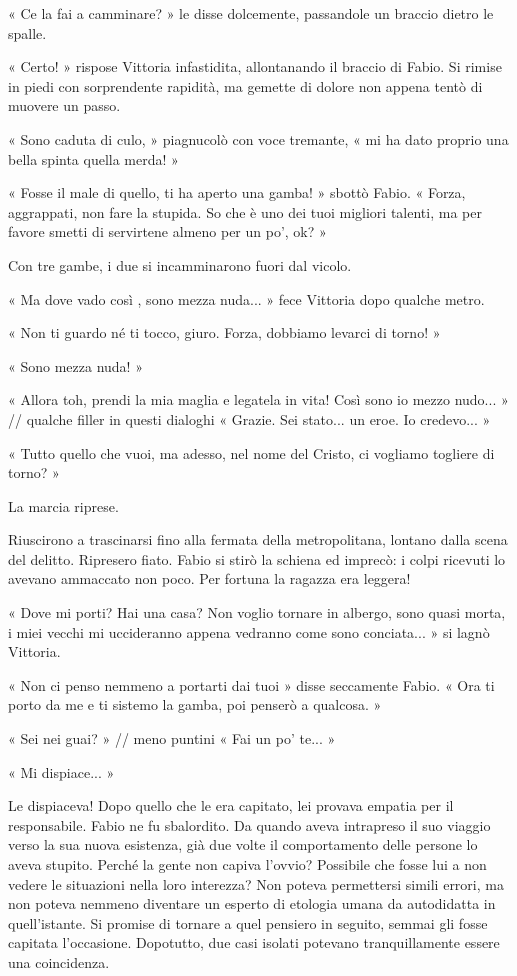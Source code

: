 « Ce la fai a camminare? » le disse dolcemente, passandole un braccio dietro le spalle.

« Certo! » rispose Vittoria infastidita, allontanando il braccio di Fabio. Si rimise in piedi con sorprendente rapidità, ma gemette di dolore non appena tentò di muovere un passo.

« Sono caduta di culo, » piagnucolò con voce tremante, « mi ha dato proprio una bella spinta quella merda! »

« Fosse il male di quello, ti ha aperto una gamba! » sbottò Fabio. « Forza, aggrappati, non fare la stupida. So che è uno dei tuoi migliori talenti, ma per favore smetti di servirtene almeno per un po', ok?  »

Con tre gambe, i due si incamminarono fuori dal vicolo.

« Ma dove vado così , sono mezza nuda... » fece Vittoria dopo qualche metro.

« Non ti guardo né ti tocco, giuro. Forza, dobbiamo levarci di torno! »

« Sono mezza nuda! »

« Allora toh, prendi la mia maglia e legatela in vita! Così sono io mezzo nudo... »
// qualche filler in questi dialoghi
« Grazie. Sei stato... un eroe. Io credevo... »

« Tutto quello che vuoi, ma adesso, nel nome del Cristo, ci vogliamo togliere di torno? »

La marcia riprese.

Riuscirono a trascinarsi fino alla fermata della metropolitana, lontano dalla scena del delitto. Ripresero fiato. Fabio si stirò la schiena ed imprecò: i colpi ricevuti lo avevano ammaccato non poco. Per fortuna la ragazza era leggera!

« Dove mi porti? Hai una casa? Non voglio tornare in albergo, sono quasi morta, i miei vecchi mi uccideranno appena vedranno come sono conciata... » si lagnò Vittoria.

« Non ci penso nemmeno a portarti dai tuoi » disse seccamente Fabio. « Ora ti porto da me e ti sistemo la gamba, poi penserò a qualcosa. »

« Sei nei guai? »
// meno puntini
« Fai un po' te... »

« Mi dispiace... »

Le dispiaceva! Dopo quello che le era capitato, lei provava empatia per il responsabile. Fabio ne fu sbalordito. Da quando aveva intrapreso il suo viaggio verso la sua nuova esistenza, già due volte il comportamento delle persone lo aveva stupito. Perché la gente non capiva l'ovvio? Possibile che fosse lui a non vedere le situazioni nella loro interezza? Non poteva permettersi simili errori, ma non poteva nemmeno diventare un esperto di etologia umana da autodidatta in quell'istante. Si promise di tornare a quel pensiero in seguito, semmai gli fosse capitata l'occasione. Dopotutto, due casi isolati potevano tranquillamente essere una coincidenza.

